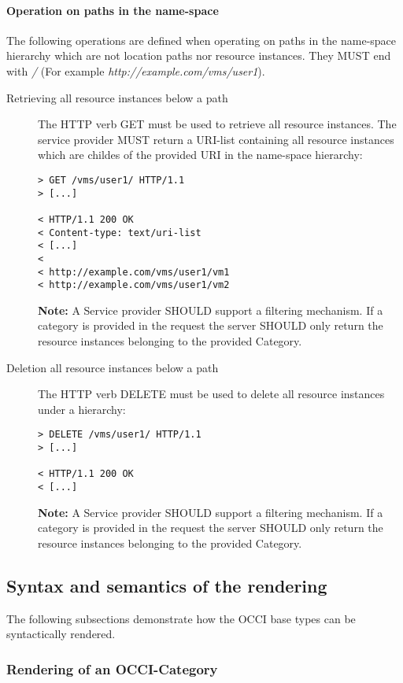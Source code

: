 \documentclass[10pt,a4paper]{article}
\begin{document}
\paragraph{Operation on paths in the name-space}
The following operations are defined when operating on paths in the
name-space hierarchy which are not location paths nor resource
instances. They MUST end with \emph{/} (For example
\emph{http://example.com/vms/user1}).

\begin{description}
\item[Retrieving all resource instances below a path] The HTTP verb
  GET must be used to retrieve all resource instances. The service
  provider MUST return a URI-list containing all resource instances
  which are childes of the provided URI in the name-space hierarchy:
\begin{verbatim}
> GET /vms/user1/ HTTP/1.1
> [...]
 
< HTTP/1.1 200 OK
< Content-type: text/uri-list
< [...]
< 
< http://example.com/vms/user1/vm1
< http://example.com/vms/user1/vm2
\end{verbatim}
\textbf{Note:} A Service provider SHOULD support a filtering
mechanism. If a category is provided in the request the server SHOULD
only return the resource instances belonging to the provided
Category.

\item[Deletion all resource instances below a path] The HTTP verb
  DELETE must be used to delete all resource instances under a
  hierarchy:
\begin{verbatim}
> DELETE /vms/user1/ HTTP/1.1
> [...]
 
< HTTP/1.1 200 OK
< [...]
\end{verbatim}
\textbf{Note:} A Service provider SHOULD support a filtering
mechanism. If a category is provided in the request the server SHOULD
only return the resource instances belonging to the provided
Category.
\end{description}

\subsection{Syntax and semantics of the rendering}
\label{sec:syntax}
The following subsections demonstrate how the OCCI base types can be
syntactically rendered.

\subsubsection{Rendering of an OCCI-Category}
\end{document}
